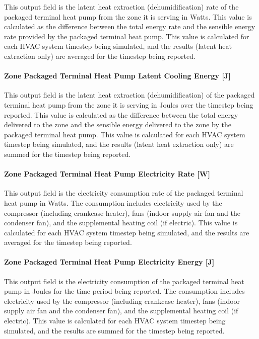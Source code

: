 This output field is the latent heat extraction (dehumidification) rate of the packaged terminal heat pump from the zone it is serving in Watts. This value is calculated as the difference between the total energy rate and the sensible energy rate provided by the packaged terminal heat pump. This value is calculated for each HVAC system timestep being simulated, and the results (latent heat extraction only) are averaged for the timestep being reported.

\paragraph{Zone Packaged Terminal Heat Pump Latent Cooling Energy {[}J{]}}\label{zone-packaged-terminal-heat-pump-latent-cooling-energy-j}

This output field is the latent heat extraction (dehumidification) of the packaged terminal heat pump from the zone it is serving in Joules over the timestep being reported. This value is calculated as the difference between the total energy delivered to the zone and the sensible energy delivered to the zone by the packaged terminal heat pump. This value is calculated for each HVAC system timestep being simulated, and the results (latent heat extraction only) are summed for the timestep being reported.

\paragraph{Zone Packaged Terminal Heat Pump Electricity Rate {[}W{]}}\label{zone-packaged-terminal-heat-pump-electric-power-w}

This output field is the electricity consumption rate of the packaged terminal heat pump in Watts. The consumption includes electricity used by the compressor (including crankcase heater), fans (indoor supply air fan and the condenser fan), and the supplemental heating coil (if electric). This value is calculated for each HVAC system timestep being simulated, and the results are averaged for the timestep being reported.

\paragraph{Zone Packaged Terminal Heat Pump Electricity Energy {[}J{]}}\label{zone-packaged-terminal-heat-pump-electric-energy-j}

This output field is the electricity consumption of the packaged terminal heat pump in Joules for the time period being reported. The consumption includes electricity used by the compressor (including crankcase heater), fans (indoor supply air fan and the condenser fan), and the supplemental heating coil (if electric). This value is calculated for each HVAC system timestep being simulated, and the results are summed for the timestep being reported.

